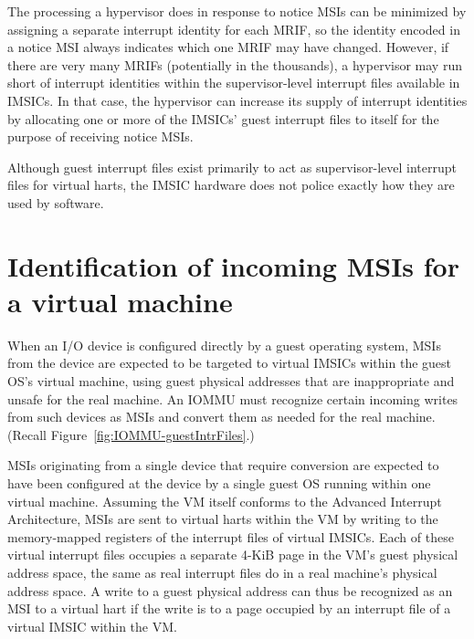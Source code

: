 The processing a hypervisor does in response to notice MSIs can be
minimized by assigning a separate interrupt identity for each MRIF, so
the identity encoded in a notice MSI always indicates which one MRIF
may have changed.
However, if there are very many MRIFs (potentially in the thousands),
a hypervisor may run short of interrupt identities within the
supervisor-level interrupt files available in IMSICs.
In that case, the hypervisor can increase its supply of interrupt
identities by allocating one or more of the IMSICs' guest interrupt
files to itself for the purpose of receiving notice MSIs.

\begin{commentary}
Although guest interrupt files exist primarily to act as
supervisor-level interrupt files for virtual harts, the IMSIC hardware
does not police exactly how they are used by software.
\end{commentary}

\section{Identification of incoming MSIs for a virtual machine}
\label{sec:IOMMU-identIncomingMSIs}

When an I/O device is configured directly by a guest operating system,
MSIs from the device are expected to be targeted to virtual IMSICs
within the guest OS's virtual machine, using guest physical addresses
that are inappropriate and unsafe for the real machine.
An \mbox{IOMMU} must recognize certain incoming writes from such devices as
MSIs and convert them as needed for the real machine.
(Recall Figure~\ref{fig:IOMMU-guestIntrFiles}.)

MSIs originating from a single device that require conversion are
expected to have been configured at the device by a single guest OS
running within one {\RISCV} virtual machine.
Assuming the VM itself conforms to the Advanced Interrupt Architecture,
MSIs are sent to virtual harts within the VM by writing to the
memory-mapped registers of the interrupt files of virtual IMSICs.
Each of these virtual interrupt files occupies a separate \mbox{4-KiB}
page in the VM's guest physical address space, the same as real
interrupt files do in a real machine's physical address space.
A write to a guest physical address can thus be recognized as an MSI to
a virtual hart if the write is to a page occupied by an interrupt file
of a virtual IMSIC within the VM.

